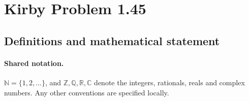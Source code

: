 \documentclass[11pt]{article}
\begin{document}
\section{Kirby Problem 1.45}\label{statement}

\subsection{Definitions and mathematical statement}

\paragraph{Shared notation.}$\mathbb N=\{1,2,\ldots\}$, and $\mathbb Z,\mathbb Q,\mathbb R,\mathbb C$ denote the integers, rationals, reals and complex numbers. Any other conventions are specified locally.
\end{document}
